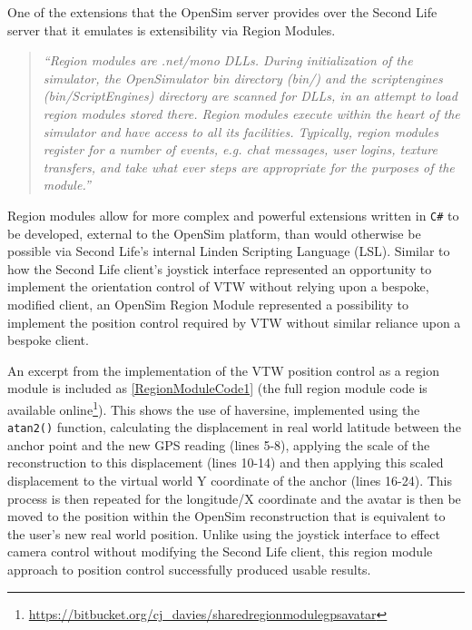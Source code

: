 \newcommand{\RegionModuleCodeFootnote}{\footnote{\url{https://bitbucket.org/cj_davies/sharedregionmodulegpsavatar}}}


One of the extensions that the OpenSim server provides over the Second Life server that it emulates is extensibility via Region Modules.

\begin{quotation}
	\textit{``Region modules are .net/mono DLLs. During initialization of the simulator, the OpenSimulator bin directory (bin/) and the scriptengines (bin/ScriptEngines) directory are scanned for DLLs, in an attempt to load region modules stored there. Region modules execute within the heart of the simulator and have access to all its facilities. Typically, region modules register for a number of events, e.g. chat messages, user logins, texture transfers, and take what ever steps are appropriate for the purposes of the module.''}\RegionModuleFootnote{}
\end{quotation}

Region modules allow for more complex and powerful extensions written in \texttt{C\#} to be developed, external to the OpenSim platform, than would otherwise be possible via Second Life's internal Linden Scripting Language (LSL). Similar to how the Second Life client's joystick interface represented an opportunity to implement the orientation control of VTW without relying upon a bespoke, modified client, an OpenSim Region Module represented a possibility to implement the position control required by VTW without similar reliance upon a bespoke client.

An excerpt from the implementation of the VTW position control as a region module is included as \ref{RegionModuleCode1} (the full region module code is available online\RegionModuleCodeFootnote{}). This shows the use of haversine, implemented using the \texttt{atan2()} function, calculating the displacement in real world latitude between the anchor point and the new GPS reading (lines 5-8), applying the scale of the reconstruction to this displacement (lines 10-14) and then applying this scaled displacement to the virtual world Y coordinate of the anchor (lines 16-24). This process is then repeated for the longitude/X coordinate and the avatar is then be moved to the position within the OpenSim reconstruction that is equivalent to the user's new real world position. Unlike using the joystick interface to effect camera control without modifying the Second Life client, this region module approach to position control successfully produced usable results.


